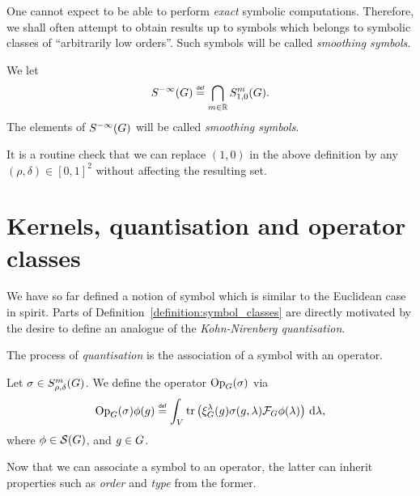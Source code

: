 One cannot expect to be able to perform \emph{exact} symbolic computations.
Therefore,
we shall often attempt to obtain results up to symbols which belongs to symbolic classes of ``arbitrarily low orders''.
Such symbols will be called \emph{smoothing symbols}.

\begin{definition}
\label{definition:smoothing_symbols}
    We let
    \begin{align*}
        \SmoothingSymbols \defeq \bigcap_{m \in \R} \SymbolClass{m}{1, 0}.
    \end{align*}
    The elements of ${S^{-\infty} (G)}$ will be called \emph{smoothing symbols}.
\end{definition}

It is a routine check that we can replace $(1, 0)$ in the above definition
by any $(\rho, \delta) \in [0, 1]^2$ without affecting the resulting set.

\section{Kernels, quantisation and operator classes}

We have so far defined a notion of symbol which is similar to the Euclidean case in spirit.
Parts of Definition~\ref{definition:symbol_classes} are directly motivated by the desire to define an analogue of the \emph{Kohn-Nirenberg quantisation}.

The process of \emph{quantisation} is the association of a symbol with an operator.

\begin{definition}[Quantisation]
\label{definition:quantisation}
    Let $\sigma \in S^{m}_{\rho, \delta}(G)$.
    We define the operator $\mathrm{Op}_{G}(\sigma)$ via
    \begin{align*}
        \Op(\sigma) \phi(g) \defeq
        \int_\VectorSpace
            \tr\left(\Rep\lambda(g) \sigma(g, \lambda) \Fourier \phi(\lambda)\right)
        \dd \lambda,
    \end{align*}
    where $\phi \in {\mathcal{S} (G)}$, and $g \in G$.
\end{definition}

Now that we can associate a symbol to an operator,
the latter can inherit properties such as \emph{order} and \emph{type} from the former.


